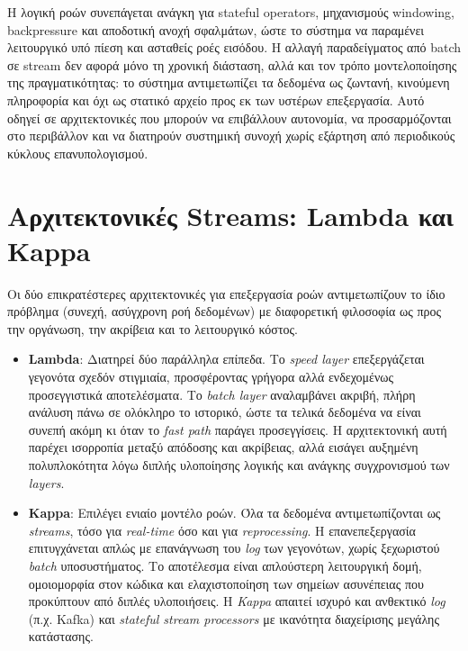 Η λογική ροών συνεπάγεται ανάγκη για stateful operators, μηχανισμούς windowing,
backpressure και αποδοτική ανοχή σφαλμάτων, ώστε το σύστημα να παραμένει
λειτουργικό υπό πίεση και ασταθείς ροές εισόδου. Η αλλαγή παραδείγματος από
batch σε stream δεν αφορά μόνο τη χρονική διάσταση, αλλά και τον τρόπο
μοντελοποίησης της πραγματικότητας: το σύστημα αντιμετωπίζει τα δεδομένα ως
ζωντανή, κινούμενη πληροφορία και όχι ως στατικό αρχείο προς εκ των υστέρων
επεξεργασία. Αυτό οδηγεί σε αρχιτεκτονικές που μπορούν να επιβάλλουν αυτονομία,
να προσαρμόζονται στο περιβάλλον και να διατηρούν συστημική συνοχή χωρίς
εξάρτηση από περιοδικούς κύκλους επανυπολογισμού.

\section{Αρχιτεκτονικές Streams: Lambda και Kappa}

Οι δύο επικρατέστερες αρχιτεκτονικές για επεξεργασία ροών αντιμετωπίζουν το
ίδιο πρόβλημα (συνεχή, ασύγχρονη ροή δεδομένων) με διαφορετική φιλοσοφία ως
προς την οργάνωση, την ακρίβεια και το λειτουργικό κόστος.

\begin{itemize}
	\item \textbf{Lambda}: Διατηρεί δύο παράλληλα επίπεδα. Το \textit{speed
		      layer} επεξεργάζεται γεγονότα σχεδόν στιγμιαία, προσφέροντας
	      γρήγορα αλλά ενδεχομένως προσεγγιστικά αποτελέσματα. Το
	      \textit{batch layer} αναλαμβάνει ακριβή, πλήρη ανάλυση πάνω σε
	      ολόκληρο το ιστορικό, ώστε τα τελικά δεδομένα να είναι συνεπή
	      ακόμη κι όταν το \textit{fast path} παράγει προσεγγίσεις. Η
	      αρχιτεκτονική αυτή παρέχει ισορροπία μεταξύ απόδοσης και
	      ακρίβειας, αλλά εισάγει αυξημένη πολυπλοκότητα λόγω διπλής
	      υλοποίησης λογικής και ανάγκης συγχρονισμού των
	      \textit{layers}.
	\item \textbf{Kappa}: Επιλέγει ενιαίο μοντέλο ροών. Όλα τα δεδομένα
	      αντιμετωπίζονται ως \textit{streams}, τόσο για
	      \textit{real-time} όσο και για \textit{reprocessing}. Η
	      επανεπεξεργασία επιτυγχάνεται απλώς με επανάγνωση του
	      \textit{log} των γεγονότων, χωρίς ξεχωριστού \textit{batch}
	      υποσυστήματος. Το αποτέλεσμα είναι απλούστερη λειτουργική δομή,
	      ομοιομορφία στον κώδικα και ελαχιστοποίηση των σημείων
	      ασυνέπειας που προκύπτουν από διπλές υλοποιήσεις. Η
	      \textit{Kappa} απαιτεί ισχυρό και ανθεκτικό \textit{log} (π.χ.
	      Kafka) και \textit{stateful stream processors} με ικανότητα
	      διαχείρισης μεγάλης κατάστασης.
\end{itemize}

